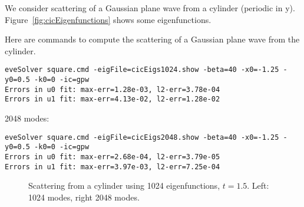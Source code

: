 We consider scattering of a Gaussian plane wave from a cylinder (periodic in y).
Figure~\ref{fig:cicEigenfunctions} shows some eigenfunctions.





\clearpage
Here are commands to compute the scattering of a Gaussian plane wave from the cylinder.
\begin{Verbatim}[fontsize=\footnotesize]
eveSolver square.cmd -eigFile=cicEigs1024.show -beta=40 -x0=-1.25 -y0=0.5 -k0=0 -ic=gpw
Errors in u0 fit: max-err=1.28e-03, l2-err=3.78e-04
Errors in u1 fit: max-err=4.13e-02, l2-err=1.28e-02
\end{Verbatim}

2048 modes: 
\begin{Verbatim}[fontsize=\footnotesize]
eveSolver square.cmd -eigFile=cicEigs2048.show -beta=40 -x0=-1.25 -y0=0.5 -k0=0 -ic=gpw
Errors in u0 fit: max-err=2.68e-04, l2-err=3.79e-05
Errors in u1 fit: max-err=3.97e-03, l2-err=7.25e-04
\end{Verbatim}

{
\newcommand{\width}{8cm}
\begin{figure}[htb]
\begin{center}
\end{center}
\caption{Scattering from a cylinder using 1024 eigenfunctions, $t=1.5$. Left: 1024 modes, right 2048 modes.}
\label{fig:cicScattering}
\end{figure}
}


